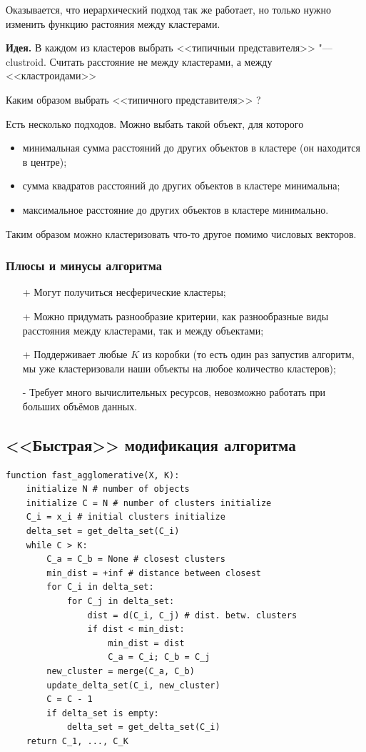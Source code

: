 Оказывается, что иерархический подход так же работает, но только нужно изменить функцию растояния между кластерами.

{\bf Идея.} В каждом из кластеров выбрать <<типичныи представителя>> "–-- clustroid. Считать расстояние не между кластерами, а между <<кластроидами>>

Каким образом выбрать <<типичного представителя>> ?

Есть несколько подходов. 
Можно выбать такой объект, для которого
\begin{itemize}
\item минимальная сумма расстояний до других объектов в кластере (он находится в центре);
\item сумма квадратов расстояний до других объектов в кластере минимальна; 
\item максимальное расстояние до других объектов в кластере минимально.
\end{itemize}

Таким образом можно кластеризовать что-то другое помимо числовых векторов.

\subsubsection{Плюсы и минусы алгоритма}
\begin{itemize}
\item[+] Могут получиться несферические кластеры;
\item[+] Можно придумать разнообразие критерии, как разнообразные виды расстояния между кластерами, так и между объектами;
\item[+] Поддерживает любые $K$ из коробки (то есть один раз запустив алгоритм, мы уже кластеризовали наши объекты на любое количество кластеров);
\item[-] Требует много вычислительных ресурсов, невозможно работать при больших объёмов данных.
\end{itemize}

\subsection{<<Быстрая>> модификация алгоритма}
\begin{lstlisting}
function fast_agglomerative(X, K):
    initialize N # number of objects
    initialize C = N # number of clusters initialize 
    C_i = x_i # initial clusters initialize 
    delta_set = get_delta_set(C_i) 
    while C > K:
        C_a = C_b = None # closest clusters 
        min_dist = +inf # distance between closest 
        for C_i in delta_set:
            for C_j in delta_set:
                dist = d(C_i, C_j) # dist. betw. clusters 
                if dist < min_dist:
                    min_dist = dist
                    C_a = C_i; C_b = C_j 
        new_cluster = merge(C_a, C_b)
        update_delta_set(C_i, new_cluster) 
        C = C - 1
        if delta_set is empty:
            delta_set = get_delta_set(C_i) 
    return C_1, ..., C_K
\end{lstlisting}

